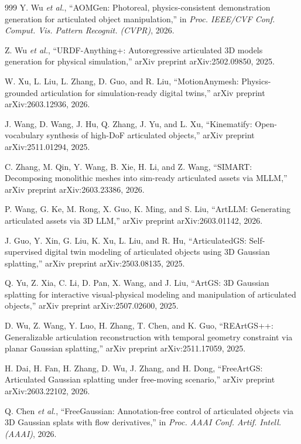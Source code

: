 \documentclass[12pt,a4paper,oneside]{report}
\begin{document}
\begin{thebibliography}{999}
Y. Wu \textit{et al.}, ``{AOMGen}: Photoreal, physics-consistent demonstration generation for articulated object manipulation,'' in \textit{Proc. IEEE/CVF Conf. Comput. Vis. Pattern Recognit. (CVPR)}, 2026.

Z. Wu \textit{et al.}, ``{URDF-Anything+}: Autoregressive articulated {3D} models generation for physical simulation,'' arXiv preprint arXiv:2502.09850, 2025.

W. Xu, L. Liu, L. Zhang, D. Guo, and R. Liu, ``{MotionAnymesh}: Physics-grounded articulation for simulation-ready digital twins,'' arXiv preprint arXiv:2603.12936, 2026.

J. Wang, D. Wang, J. Hu, Q. Zhang, J. Yu, and L. Xu, ``Kinematify: Open-vocabulary synthesis of high-{DoF} articulated objects,'' arXiv preprint arXiv:2511.01294, 2025.

C. Zhang, M. Qin, Y. Wang, B. Xie, H. Li, and Z. Wang, ``{SIMART}: Decomposing monolithic meshes into sim-ready articulated assets via {MLLM},'' arXiv preprint arXiv:2603.23386, 2026.

P. Wang, G. Ke, M. Rong, X. Guo, K. Ming, and S. Liu, ``ArtLLM: Generating articulated assets via {3D} LLM,'' arXiv preprint arXiv:2603.01142, 2026.

J. Guo, Y. Xin, G. Liu, K. Xu, L. Liu, and R. Hu, ``{ArticulatedGS}: Self-supervised digital twin modeling of articulated objects using {3D} Gaussian splatting,'' arXiv preprint arXiv:2503.08135, 2025.

Q. Yu, Z. Xia, C. Li, D. Pan, X. Wang, and J. Liu, ``{ArtGS}: {3D} Gaussian splatting for interactive visual-physical modeling and manipulation of articulated objects,'' arXiv preprint arXiv:2507.02600, 2025.

D. Wu, Z. Wang, Y. Luo, H. Zhang, T. Chen, and K. Guo, ``{REArtGS++}: Generalizable articulation reconstruction with temporal geometry constraint via planar Gaussian splatting,'' arXiv preprint arXiv:2511.17059, 2025.

H. Dai, H. Fan, H. Zhang, D. Wu, J. Zhang, and H. Dong, ``{FreeArtGS}: Articulated Gaussian splatting under free-moving scenario,'' arXiv preprint arXiv:2603.22102, 2026.

Q. Chen \textit{et al.}, ``{FreeGaussian}: Annotation-free control of articulated objects via {3D} Gaussian splats with flow derivatives,'' in \textit{Proc. AAAI Conf. Artif. Intell. (AAAI)}, 2026.


\end{thebibliography}
\end{document}
